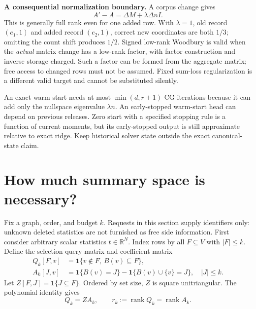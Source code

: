 \documentclass[11pt,a4paper]{article}
\theoremstyle{definition}\newtheorem{definition}[theorem]{Definition}
\newcommand{\R}{\mathbb R}\newcommand{\E}{\mathbb E}\newcommand{\1}{\mathbf 1}
\begin{document}
\textbf{A consequential normalization boundary.} A corpus change gives
\[
 A'-A=\Delta M+\lambda\Delta n I.
\]
This is generally full rank even for one added row. With $\lambda=1$, old record $(e_1,1)$ and added record $(e_2,1)$, correct new coordinates are both $1/3$; omitting the count shift produces $1/2$. Signed low-rank Woodbury is valid when the \emph{actual} matrix change has a low-rank factor, with factor construction and inverse storage charged. Such a factor can be formed from the aggregate matrix; free access to changed rows must not be assumed. Fixed sum-loss regularization is a different valid target and cannot be substituted silently.

An exact warm start needs at most $\min(d,r+1)$ CG iterations because it can add only the nullspace eigenvalue $\lambda n$. An early-stopped warm-start head can depend on previous releases. Zero start with a specified stopping rule is a function of current moments, but its early-stopped output is still approximate relative to exact ridge. Keep historical solver state outside the exact canonical-state claim.

\section{How much summary space is necessary?}\label{sec:rank}
Fix a graph, order, and budget $k$. Requests in this section supply identifiers only: unknown deleted statistics are not furnished as free side information. First consider arbitrary scalar statistics $t\in\R^N$. Index rows by all $F\subseteq V$ with $|F|\le k$. Define the selection-query matrix and coefficient matrix
\begin{align}
 Q_k[F,v]&=\1\{v\notin F,\ B(v)\subseteq F\},\\
 A_k[J,v]&=\1\{B(v)=J\}-\1\{B(v)\cup\{v\}=J\},\quad |J|\le k.
\end{align}
Let $Z[F,J]=\1\{J\subseteq F\}$. Ordered by set size, $Z$ is square unitriangular. The polynomial identity gives
\begin{equation}
 Q_k=ZA_k,\qquad r_k:=\operatorname{rank}Q_k=\operatorname{rank}A_k.
\end{equation}
\end{document}
